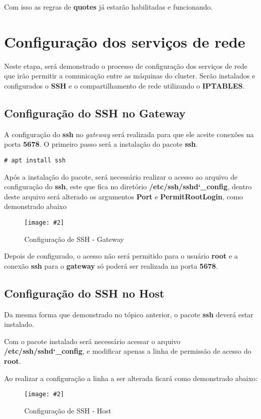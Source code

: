\documentclass[
	12pt,				%
	openany,			%
	a4paper,			%
	chapter=TITLE,		%
	section=TITLE,		%
	english,
	brazil				%
]{abntex2}
\newcommand{\includeImage}[3] {

\begin{figure}[H]
 	 \centering
  		\texttt{[image: \#2]}
  	\caption{#3}
\end{figure}

}
\begin{document}
Com isso as regras de \textbf{quotes} já estarão habilitadas e funcionando.

\section{Configuração dos serviços de rede}

Neste etapa, será demonstrado o processo de configuração dos serviços de rede que irão permitir a comunicação entre as máquinas do cluster. Serão instalados e configurados o \textbf{SSH} e o compartilhamento de rede utilizando o \textbf{IPTABLES}.

\subsection{Configuração do SSH no Gateway}

A configuração do \textbf{ssh} no \textit{gateway} será realizada para que ele aceite conexões na porta \textbf{5678}. O primeiro passo será a instalação do pacote \textbf{ssh}.

\begin{lstlisting}
# apt install ssh
\end{lstlisting}

Após a instalação do pacote, será necessário realizar o acesso ao arquivo de configuração do \textbf{ssh}, este que fica no diretório \textbf{/etc/ssh/sshd\char`_config}, dentro deste arquivo será alterado os argumentos \textbf{Port} e \textbf{PermitRootLogin}, como demonstrado abaixo 

\includeImage{0.7}{imgs/4_configuracao_servicos_rede/1_gateway_1.png}{Configuração de SSH - Gateway}

Depois de configurado, o acesso não será permitido para o usuário \textbf{root} e a conexão \textbf{ssh} para o \textbf{gateway} só poderá ser realizada na porta \textbf{5678}.

\subsection{Configuração do SSH no Host}

Da mesma forma que demonstrado no tópico anterior, o pacote \textbf{ssh} deverá estar instalado.

Com o pacote instalado será necessário acessar o arquivo \textbf{/etc/ssh/sshd\char`_config}, e modificar apenas a linha de permissão de acesso do \textbf{root}. 

Ao realizar a configuração a linha a ser alterada ficará como demonstrado abaixo:
\includeImage{0.7}{imgs/4_configuracao_servicos_rede/1_host_1.png}{Configuração de SSH - Host}
\end{document}
